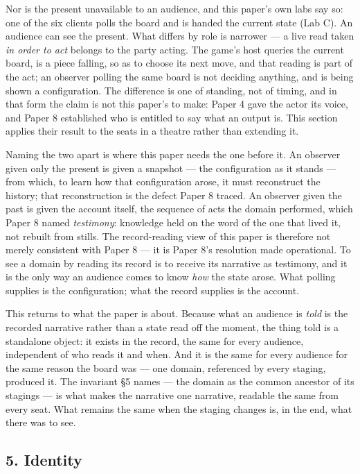 \documentclass[
]{article}
\begin{document}
Nor is the present unavailable to an audience, and this paper's own labs
say so: one of the six clients polls the board and is handed the current
state (Lab C). An audience can see the present. What differs by role is
narrower --- a live read taken \emph{in order to act} belongs to the
party acting. The game's host queries the current board, is a piece
falling, so as to choose its next move, and that reading is part of the
act; an observer polling the same board is not deciding anything, and is
being shown a configuration. The difference is one of standing, not of
timing, and in that form the claim is not this paper's to make: Paper 4
gave the actor its voice, and Paper 8 established who is entitled to say
what an output is. This section applies their result to the seats in a
theatre rather than extending it.

Naming the two apart is where this paper needs the one before it. An
observer given only the present is given a snapshot --- the
configuration as it stands --- from which, to learn how that
configuration arose, it must reconstruct the history; that
reconstruction is the defect Paper 8 traced. An observer given the past
is given the account itself, the sequence of acts the domain performed,
which Paper 8 named \emph{testimony}: knowledge held on the word of the
one that lived it, not rebuilt from stills. The record-reading view of
this paper is therefore not merely consistent with Paper 8 --- it is
Paper 8's resolution made operational. To see a domain by reading its
record is to receive its narrative as testimony, and it is the only way
an audience comes to know \emph{how} the state arose. What polling
supplies is the configuration; what the record supplies is the account.

This returns to what the paper is about. Because what an audience is
\emph{told} is the recorded narrative rather than a state read off the
moment, the thing told is a standalone object: it exists in the record,
the same for every audience, independent of who reads it and when. And
it is the same for every audience for the same reason the board was ---
one domain, referenced by every staging, produced it. The invariant §5
names --- the domain as the common ancestor of its stagings --- is what
makes the narrative one narrative, readable the same from every seat.
What remains the same when the staging changes is, in the end, what
there was to see.

\subsection{5. Identity}\label{identity}
\end{document}

